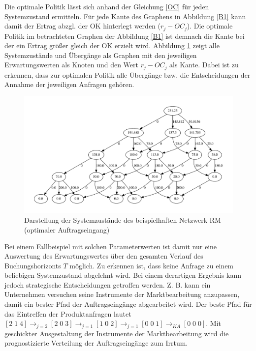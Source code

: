 Die optimale Politik lässt sich anhand der Gleichung \eqref{OC} für jeden Systemzustand ermitteln. Für jede Kante des Graphens in Abbildung \ref{B1} kann damit der Ertrag abzgl. der OK hinterlegt werden ($r_{j}-OC_{j}$). Die optimale Politik im betrachteten Graphen der Abbildung \ref{B1} ist demnach die Kante bei der ein Ertrag größer gleich der OK erzielt wird. Abbildung \ref{B1a} zeigt alle Systemzustände und Übergänge als Graphen mit den jeweiligen Erwartungswerten als Knoten und den Wert $r_{j}-OC_{j}$ als Kante. Dabei ist zu erkennen, dass zur optimalen Politik alle Übergänge bzw. die Entscheidungen der Annahme der jeweiligen Anfragen gehören.
\begin{figure}[h!]
  \begin{center}
    \includegraphics[width=150mm]{Bilder/Beispiel1a.pdf}
    \caption{Darstellung der Systemzustände des beispielhaften Netzwerk RM (optimaler Auftragseingang)}  \label{B1a}
  \end{center}
\end{figure}

Bei einem Fallbeispiel mit solchen Parameterwerten ist damit nur eine Auswertung des Erwartungswertes über den gesamten Verlauf des Buchungshorizonts $T$ möglich. Zu erkennen ist, dass keine Anfrage zu einem beliebigen Systemzustand abgelehnt wird. Bei einem derartigen Ergebnis kann jedoch strategische Entscheidungen getroffen werden. Z. B. kann ein Unternehmen versuchen seine Instrumente der Marktbearbeitung anzupassen, damit ein bester Pfad der Auftragseingänge abgearbeitet wird. Der beste Pfad für das Eintreffen der Produktanfragen lautet $[2\;1\;4] \rightarrow_{j={2}}[2\;0\;3] \rightarrow_{j={1}}[1\;0\;2]\rightarrow_{j={1}}[0\;0\;1]\rightarrow_{KA}[0\;0\;0]$. Mit geschickter Ausgestaltung der Instrumente der Marktbearbeitung wird die prognostizierte Verteilung der Auftragseingänge zum Irrtum.

